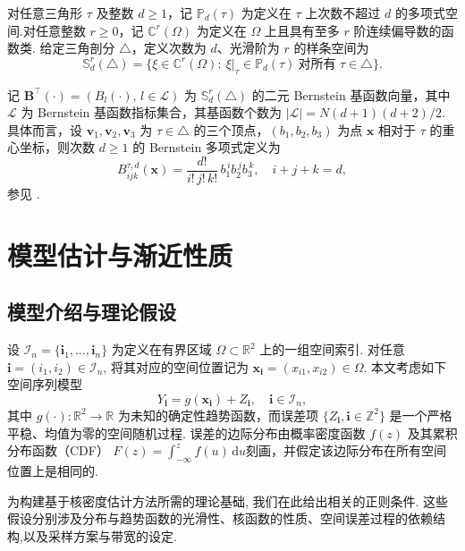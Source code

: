 \documentclass[a4paper,openay,14pt]{ctexbook}
\numberwithin{equation}{section}
\numberwithin{lem}{section}
\newcommand{\chapterwithfancyheader}[1]{  
    \chapter{#1} %
    \thispagestyle{fancy} %
}
\begin{document}
对任意三角形 $\tau$ 及整数 $d\ge 1$，记 $\mathbb{P}_d(\tau)$ 为定义在 $\tau$ 上次数不超过 $d$ 的多项式空间.对任意整数 $r\ge 0$，记 $\mathbb{C}^{r}(\Omega)$ 为定义在 $\Omega$ 上且具有至多 $r$ 阶连续偏导数的函数类. 给定三角剖分 $\triangle$，定义次数为 $d$、光滑阶为 $r$ 的样条空间为
\begin{equation}\label{DEF:S_rd}
  \mathbb{S}_{d}^{r}(\triangle)
  = \bigl\{\xi\in \mathbb{C}^{r}(\Omega): \ \xi|_{\tau}\in \mathbb{P}_d(\tau)\ \text{对所有 } \tau\in\triangle \bigr\}.
\end{equation}

记 $\mathbf{B}^\top(\boldsymbol{\cdot})=\left(B_{l}(\boldsymbol{\cdot}),\,l\in\mathcal{L}\right)$ 为 $\mathbb{S}_{d}^{r}(\triangle)$ 的二元 Bernstein 基函数向量，其中 $\mathcal{L}$ 为 Bernstein 基函数指标集合，其基函数个数为
$|\mathcal{L}|=N(d+1)(d+2)/2$.
具体而言，设 $\mathbf{v}_1,\mathbf{v}_2,\mathbf{v}_3$ 为 $\tau\in\triangle$ 的三个顶点，$(b_1,b_2,b_3)$ 为点 $\boldsymbol{x}$ 相对于 $\tau$ 的重心坐标，则次数 $d\ge 1$ 的 Bernstein 多项式定义为
\[
B^{\tau,d}_{ijk}(\boldsymbol{x})
=\frac{d!}{i!\,j!\,k!}\,b_1^{\,i} b_2^{\,j} b_3^{\,k},
\quad i+j+k=d,
\]
参见 \cite{lai2007spline}. 


\chapterwithfancyheader{模型估计与渐近性质}\label{SEC: result}
\section{模型介绍与理论假设}
设 \(\mathcal{I}_n = \{\mathbf{i}_1, \ldots, \mathbf{i}_n\}\) 为定义在有界区域 \(\Omega \subset \mathbb{R}^2\) 上的一组空间索引. 对任意 \(\mathbf{i} = (i_1, i_2) \in \mathcal{I}_n\), 将其对应的空间位置记为 \(\boldsymbol{x}_{\mathbf{i}} = (x_{i1}, x_{i2}) \in \Omega\). 本文考虑如下空间序列模型
\begin{equation}\label{model:nonparbiregression}
   Y_{\mathbf{i}} = g(\boldsymbol{x}_{\mathbf{i}}) + Z_{\mathbf{i}}, 
   \quad \mathbf{i} \in \mathcal{I}_n,
\end{equation}
其中 \( g(\cdot): \mathbb{R}^2 \to \mathbb{R} \) 为未知的确定性趋势函数，而误差项
\(\{Z_{\mathbf{i}}, \mathbf{i} \in \mathbb{Z}^2\}\) 是一个严格平稳、均值为零的空间随机过程. 误差的边际分布由概率密度函数 \( f(z) \) 及其累积分布函数（CDF）
\(F(z) = \int_{-\infty}^{z} f(u)\,\mathrm{d}u\)刻画，并假定该边际分布在所有空间位置上是相同的.

为构建基于核密度估计方法所需的理论基础, 我们在此给出相关的正则条件. 这些假设分别涉及分布与趋势函数的光滑性、核函数的性质、空间误差过程的依赖结构,以及采样方案与带宽的设定.
\end{document}
